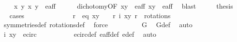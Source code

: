 \begin{isabellebody}
\ \ \ {\isacharbar}\ {\isachardoublequoteopen}{\isacharparenleft}{\isacharparenleft}x{\isacharcomma}\ y{\isacharparenright}{\isacharcomma}\ x{\isacharprime}{\isacharcomma}\ y{\isacharprime}{\isacharparenright}\ {\isasymin}\ e{\isacharunderscore}aff{\isacharunderscore}{}{\isachardoublequoteclose}\isanewline
\ \ \ \ \isamarkupfalse%
\ dichotomy{\isacharunderscore}{}{\isacharbrackleft}OF\ {\isacartoucheopen}{\isacharparenleft}x{\isacharcomma}y{\isacharparenright}\ {\isasymin}\ e{\isacharunderscore}aff{\isacartoucheclose}\ {\isacartoucheopen}{\isacharparenleft}x{\isacharprime}{\isacharcomma}y{\isacharprime}{\isacharparenright}\ {\isasymin}\ e{\isacharunderscore}aff{\isacartoucheclose}{\isacharbrackright}\ \isamarkupfalse%
\ blast\isanewline
\ \ \isamarkupfalse%
\ \isamarkupfalse%
\ {\isacharquery}thesis\ \isanewline
\ \ \isamarkupfalse%
{\isacharparenleft}cases{\isacharparenright}\isanewline
\ \ \ \ \isamarkupfalse%
\ {}\isanewline
\ \ \ \ \isamarkupfalse%
\ \isamarkupfalse%
\ r\ \ eq{\isacharcolon}\ {\isachardoublequoteopen}{\isacharparenleft}x{\isacharprime}{\isacharcomma}y{\isacharprime}{\isacharparenright}\ {\isacharequal}\ {\isacharparenleft}{\isasymtau}\ {\isasymcirc}\ r{\isacharparenright}\ {\isacharparenleft}i\ {\isacharparenleft}x{\isacharcomma}y{\isacharparenright}{\isacharparenright}{\isachardoublequoteclose}\ {\isachardoublequoteopen}r\ {\isasymin}\ rotations{\isachardoublequoteclose}\isanewline
\ \ \ \ \ \ \isamarkupfalse%
\ symmetries{\isacharunderscore}def\ rotations{\isacharunderscore}def\ \isamarkupfalse%
\ force\isanewline
\ \ \ \ \isamarkupfalse%
\ \isamarkupfalse%
\ {\isachardoublequoteopen}{\isasymtau}\ {\isasymin}\ G{\isachardoublequoteclose}\ \isamarkupfalse%
\ G{\isacharunderscore}def\ \isamarkupfalse%
\ auto\isanewline
\ \ \ \ \isamarkupfalse%
\ {\isachardoublequoteopen}i\ {\isacharparenleft}x{\isacharcomma}y{\isacharparenright}\ {\isasymin}\ e{\isacharunderscore}circ{\isachardoublequoteclose}\isanewline
\ \ \ \ \ \ \isamarkupfalse%
\ {}\ \isamarkupfalse%
\ e{\isacharunderscore}circ{\isacharunderscore}def\ e{\isacharunderscore}aff{\isacharunderscore}def\ e{\isacharprime}{\isacharunderscore}def\ \isamarkupfalse%
\ auto\isanewline
\ \ \ \ \isamarkupfalse%

\end{isabellebody}
